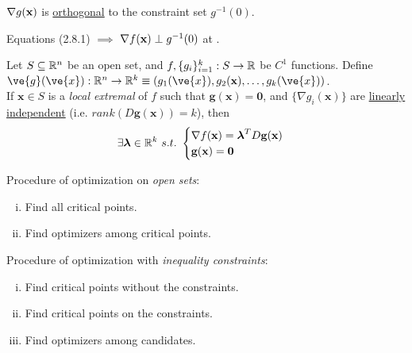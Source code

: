 \documentclass[11pt]{article}
\begin{document}
			\begin{lemma}
				$\nabla g(\textbf{x})$ is \ul{orthogonal} to the constraint set $g^{-1}(0)$.
			\end{lemma}
			
			\begin{proposition}
				Equations (2.8.1) $\implies$ $\nabla f() \perp g^{-1}(0)$ at \tbf{x}.
			\end{proposition}
			
			\begin{theorem}
				Let $S \subseteq \mathbb{R}^n$ be an open set, and $f, \{g_i\}_{i=1}^k : S \to \mathbb{R}$ be $C^1$ functions. Define $\ve{g}(\ve{x}): \R^n \to \R^k \equiv (g_1(\ve{x}), g_2(\textbf{x}), \dots, g_k(\ve{x}))$. \\
				If $\textbf{x} \in S$ is a \emph{local extremal} of $f$ such that $\textbf{g}(\textbf{x}) = \textbf{0}$, and $\{\nabla g_i(\textbf{x})\}$ are \ul{linearly independent} (i.e. $rank(D\textbf{g}(\textbf{x})) = k$), then
				\begin{equation}
					\exists \boldsymbol{\lambda} \in \R^k\ s.t.\ \begin{cases}
						\nabla f(\textbf{x}) = \boldsymbol{\lambda}^T D\textbf{g}(\textbf{x}) \\
						\textbf{g}(\textbf{x}) =\textbf{0}
					\end{cases}
				\end{equation}
			\end{theorem}
			
			\begin{remark}Procedure of optimization on \emph{open sets}:
				\begin{enumerate}[(i)]
					\item Find all critical points.
					\item Find optimizers among critical points.
				\end{enumerate}
			\end{remark}
			
			\begin{remark}Procedure of optimization with \emph{inequality constraints}:
				\begin{enumerate}[(i)]
					\item Find critical points without the constraints.
					\item Find critical points on the constraints.
					\item Find optimizers among candidates.
				\end{enumerate}
			\end{remark}
	
\end{document}
